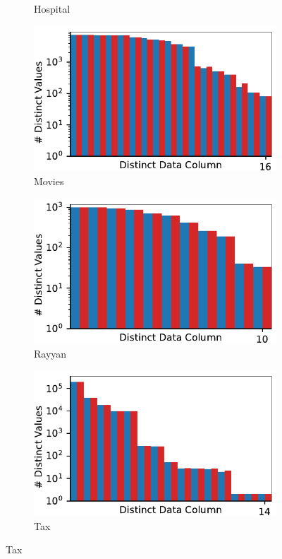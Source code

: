 \begin{figure}[!t]
\begin{subfigure}{0.4\textwidth}
    \caption{Hospital}
    \label{fig:distincts_hospitals}
\end{subfigure}
\hfill
\begin{subfigure}{0.4\textwidth}
    \includegraphics[width=\textwidth]{figures/plot/distinct/movies_distinct/combined.pdf}
    \caption{Movies}
    \label{exp:distincts_movies}
\end{subfigure}
\hfill
\begin{subfigure}{0.4\textwidth}
    \includegraphics[width=\textwidth]{figures/plot/distinct/rayyan_distinct/combined.pdf}
    \caption{Rayyan}
    \label{exp:distincts_rayyan}
\end{subfigure}
\hfill
\begin{subfigure}{0.4\textwidth}
    \includegraphics[width=\textwidth]{figures/plot/distinct/tax_distinct/combined.pdf}
    \caption{Tax}
    \label{exp:distincts_tax}
\end{subfigure}
\hfill
        

\end{figure}
